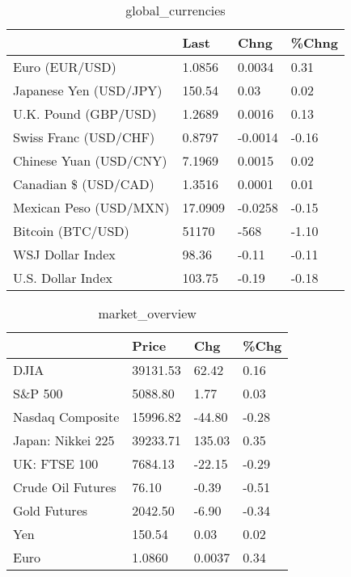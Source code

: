 \documentclass{article}%
\begin{document}
%


\begin{table}[htbp]%
\caption{global\_currencies}%
\centering%
\begin{adjustbox}{width=1\textwidth}%
\begin{tabular}{llll}
\toprule
                       &    Last &    Chng & \%Chng \\
\midrule
        Euro (EUR/USD) &  1.0856 &  0.0034 &  0.31 \\
Japanese Yen (USD/JPY) &  150.54 &    0.03 &  0.02 \\
  U.K. Pound (GBP/USD) &  1.2689 &  0.0016 &  0.13 \\
 Swiss Franc (USD/CHF) &  0.8797 & -0.0014 & -0.16 \\
Chinese Yuan (USD/CNY) &  7.1969 &  0.0015 &  0.02 \\
  Canadian \$ (USD/CAD) &  1.3516 &  0.0001 &  0.01 \\
Mexican Peso (USD/MXN) & 17.0909 & -0.0258 & -0.15 \\
     Bitcoin (BTC/USD) &   51170 &    -568 & -1.10 \\
      WSJ Dollar Index &   98.36 &   -0.11 & -0.11 \\
     U.S. Dollar Index &  103.75 &   -0.19 & -0.18 \\
\bottomrule
\end{tabular}
%
\end{adjustbox}%
\end{table}

%


\begin{table}[htbp]%
\caption{market\_overview}%
\centering%
\begin{adjustbox}{width=1\textwidth}%
\begin{tabular}{llll}
\toprule
                  &    Price &    Chg &  \%Chg \\
\midrule
             DJIA & 39131.53 &  62.42 &  0.16 \\
          S\&P 500 &  5088.80 &   1.77 &  0.03 \\
 Nasdaq Composite & 15996.82 & -44.80 & -0.28 \\
Japan: Nikkei 225 & 39233.71 & 135.03 &  0.35 \\
     UK: FTSE 100 &  7684.13 & -22.15 & -0.29 \\
Crude Oil Futures &    76.10 &  -0.39 & -0.51 \\
     Gold Futures &  2042.50 &  -6.90 & -0.34 \\
              Yen &   150.54 &   0.03 &  0.02 \\
             Euro &   1.0860 & 0.0037 &  0.34 \\
\bottomrule
\end{tabular}
%
\end{adjustbox}%
\end{table}

%
\end{document}
